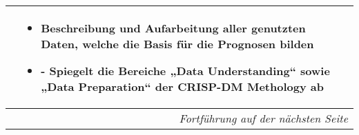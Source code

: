 \begin{table}[H]
\begin{tabularx}{\textwidth}[ht]{|l|X|X|}
        & \begin{itemize}
            \item Beschreibung und Aufarbeitung aller genutzten Daten, welche die 
            Basis für die Prognosen bilden
            \item -	Spiegelt die Bereiche „Data Understanding“ sowie 
            „Data Preparation“ der CRISP-DM Methology ab
        \end{itemize}\\
        \hline
        \multicolumn{3}{r}{\textit{Fortführung auf der nächsten Seite}} \\
    \end{tabularx}\\
    \end{table}